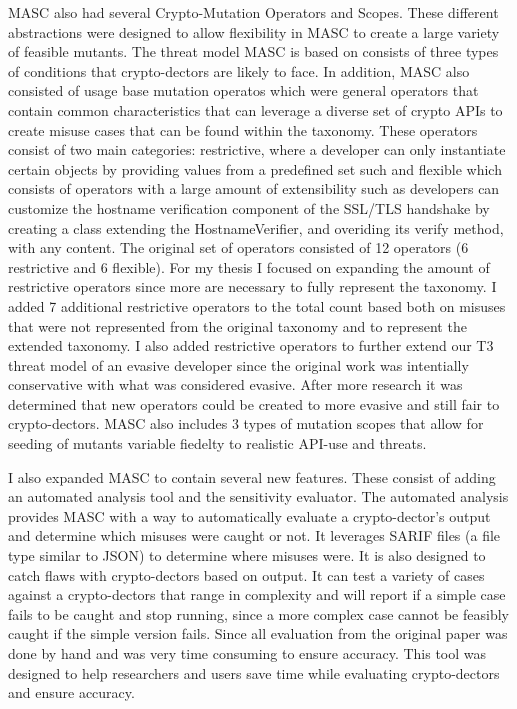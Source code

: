MASC also had several Crypto-Mutation Operators and Scopes. These different abstractions were designed to allow flexibility in MASC to create a large variety of feasible mutants. The threat model MASC is based on consists of three types of conditions that crypto-dectors are likely to face. In addition, MASC also consisted of usage base mutation operatos which were general operators that contain common characteristics that can leverage a diverse set of crypto APIs to create misuse cases that can be found within the taxonomy. These operators consist of two main categories: restrictive, where a developer can only instantiate certain objects by providing values from a predefined set such  and flexible which consists of operators with a large amount of extensibility such as developers can customize the hostname verification component of the SSL/TLS handshake by creating a class extending the HostnameVerifier, and overiding its verify method, with any content. The original set of operators consisted of 12 operators (6 restrictive and 6 flexible). For my thesis I focused on expanding the amount of restrictive operators since more are necessary to fully represent the taxonomy. I added 7  additional restrictive operators to the total count based both on misuses that were not represented from the original taxonomy and to represent the extended taxonomy. I also added restrictive operators to further extend our T3 threat model of an evasive developer since the original work was intentially conservative with what was considered evasive. After more research it was determined that new operators could be created to more evasive and still fair to crypto-dectors. MASC also includes 3 types of mutation scopes that allow for seeding of mutants variable fiedelty to realistic API-use and threats.

I also expanded MASC to contain several new features. These consist of adding an automated analysis tool and the sensitivity evaluator. The automated analysis provides MASC with a way to automatically evaluate a crypto-dector's output and determine which misuses were caught or not. It leverages SARIF files (a file type similar to JSON) to determine where misuses were. It is also designed to catch flaws with crypto-dectors based on output. It can test a variety of cases against a crypto-dectors that range in complexity and will report if a simple case fails to be caught and stop running, since a more complex case cannot be feasibly caught if the simple version fails. Since all evaluation from the original paper was done by hand and was very time consuming to ensure accuracy. This tool was designed to help researchers and users save time while evaluating crypto-dectors and ensure accuracy.


